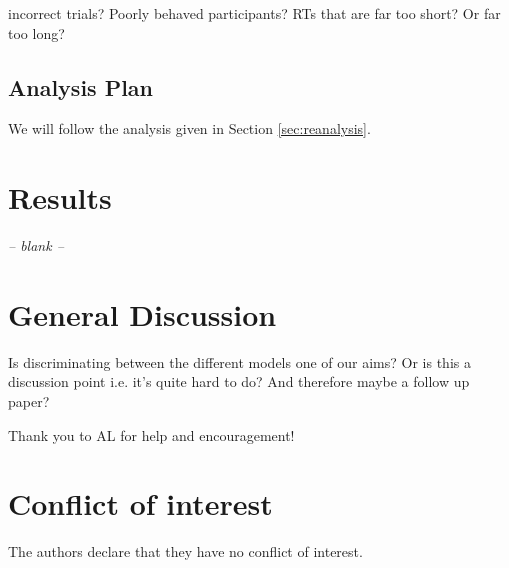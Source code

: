 \documentclass[smallextended, natbib]{svjour3}       %
\begin{document}
incorrect trials? Poorly behaved participants? RTs that are far too short? Or far too long?

\subsection{Analysis Plan}

We will follow the analysis given in Section \ref{sec:reanalysis}.


\section{Results}
\begin{center}
\textit{-- blank --}
\end{center}


\section{General Discussion}

Is discriminating between the different models one of our aims? Or is this a discussion point i.e. it's quite hard to do? And therefore maybe a follow up paper?


\begin{acknowledgements}
Thank you to AL for help and encouragement! 
\end{acknowledgements}

%
\section*{Conflict of interest}
The authors declare that they have no conflict of interest.

\end{document}

